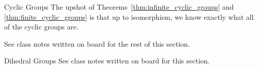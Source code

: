 \begin{section}{Cyclic Groups}
The upshot of Theorems~\ref{thm:infinite_cyclic_groups} and \ref{thm:finite_cyclic_groups} is that up to isomorphism, we know exactly what all of the cyclic groups are.

See class notes written on board for the rest of this section.


\end{section}

\begin{section}{Dihedral Groups}
See class notes written on board for this section.
\end{section}

